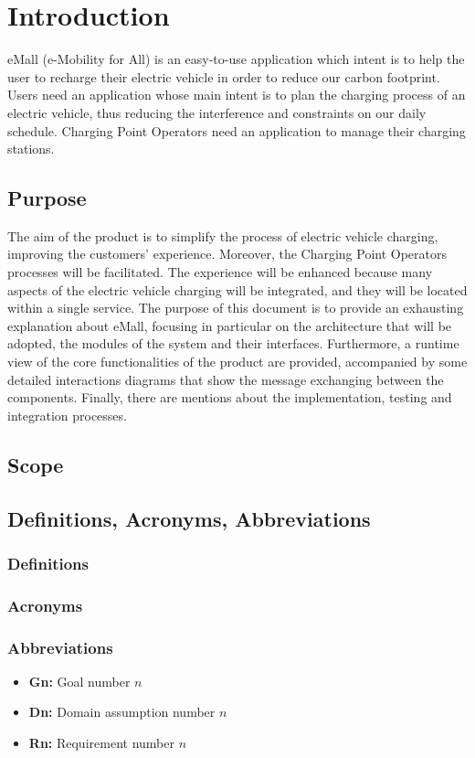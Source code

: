 \section{Introduction}
eMall (e-Mobility for All) is an easy-to-use application which intent is to help the user to recharge their electric vehicle in order to reduce our carbon footprint. Users need an application whose main intent is to plan the charging process of an electric vehicle, thus reducing the interference and constraints on our daily schedule. Charging Point Operators need an application to manage their charging stations.
\subsection{Purpose}
The aim of the product is to simplify the process of electric vehicle charging, improving the customers’ experience. Moreover, the Charging Point Operators processes will be facilitated. The experience will be enhanced because many aspects of the electric vehicle charging will be integrated, and they will be located within a single service.\newline
The purpose of this document is to provide an exhausting explanation about eMall, focusing in particular on the architecture that will be adopted, the modules of the system and their interfaces.
Furthermore, a runtime view of the core functionalities of the product are provided, accompanied by some detailed interactions diagrams that show the message exchanging between the components.
Finally, there are mentions about the implementation, testing and integration processes.
\subsection{Scope}
\subsection{Definitions, Acronyms, Abbreviations}
\subsubsection{Definitions}
\subsubsection{Acronyms}
\subsubsection{Abbreviations}
\begin{itemize}
    \item \textbf{Gn:} Goal number $n$
    \item \textbf{Dn:} Domain assumption number $n$
    \item \textbf{Rn:} Requirement number $n$
\end{itemize}

